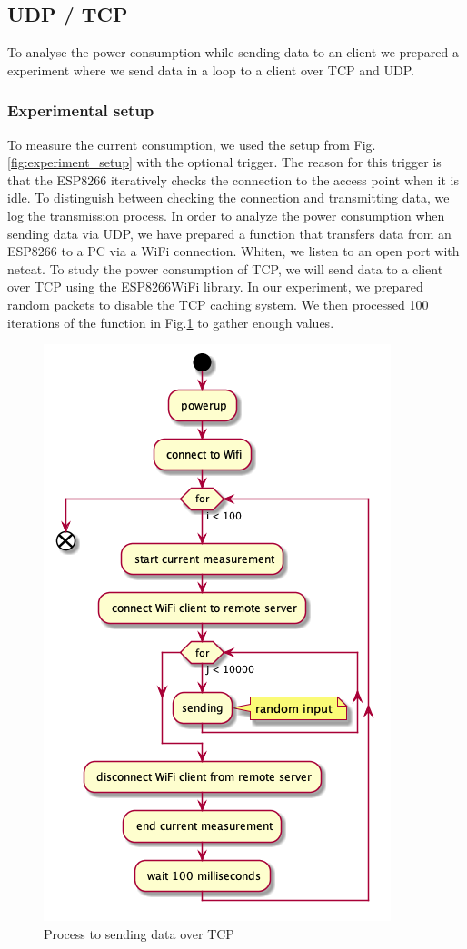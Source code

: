 \subsection{UDP / TCP}
\label{udptcp:measure}
To analyse the power consumption while sending data to an client we prepared a 
experiment where we send data in a loop to a client over TCP and UDP.\\

\subsubsection{Experimental setup}
To measure the current consumption, we used the setup from Fig.\ref{fig:experiment_setup} 
with the optional trigger.
The reason for this trigger is that the ESP8266 iteratively checks the connection to the access point when it is idle.
To distinguish between checking the connection and transmitting data, we log the transmission process.
In order to analyze the power consumption when sending data via UDP,
we have prepared a function that transfers data from an ESP8266 to a PC via a WiFi connection.
Whiten, we listen to an open port with netcat. To study the power consumption of TCP,
we will send data to a client over TCP using the ESP8266WiFi library. In our experiment,
we prepared random packets to disable the TCP caching system.
We then processed 100 iterations of the function in Fig.\ref{fig:tcp_uml}
to gather enough values.
\newline
\begin{figure}[H]
\centering
\includegraphics[width = 0.7 \linewidth]{fig/udp_tcp/tcp_uml.png}
\caption{Process to sending data over TCP}
\label{fig:tcp_uml}
\end{figure}
